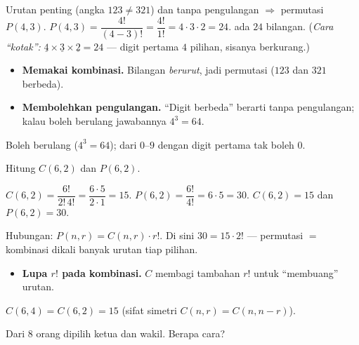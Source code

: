 \jawab
{} Urutan penting (angka $123\neq321$) dan tanpa pengulangan
$\Rightarrow$ permutasi $P(4,3)$.
 $P(4,3)=\dfrac{4!}{(4-3)!}=\dfrac{4!}{1!}=4\cdot3\cdot2=24$.
\jadi ada $24$ bilangan.
(\emph{Cara ``kotak'':} $\underline{4}\times\underline{3}\times\underline{2}=24$
--- digit pertama $4$ pilihan, sisanya berkurang.)

\begin{jebakan}
\begin{itemize}[leftmargin=*,topsep=2pt]
  \item \textbf{Memakai kombinasi.} Bilangan \emph{berurut}, jadi permutasi
  ($123$ dan $321$ berbeda).
  \item \textbf{Membolehkan pengulangan.} ``Digit berbeda'' berarti tanpa
  pengulangan; kalau boleh berulang jawabannya $4^3=64$.
\end{itemize}
\end{jebakan}

\begin{variasi}
Boleh berulang ($4^3=64$); dari $0$--$9$ dengan digit pertama tak boleh $0$.
\end{variasi}

\begin{soalbox}{}
Hitung $C(6,2)$ dan $P(6,2)$.
\end{soalbox}

\jawab
{} $C(6,2)=\dfrac{6!}{2!\,4!}=\dfrac{6\cdot5}{2\cdot1}=15$.
 $P(6,2)=\dfrac{6!}{4!}=6\cdot5=30$.
\jadi $C(6,2)=15$ dan $P(6,2)=30$.

\begin{tips}
Hubungan: $P(n,r)=C(n,r)\cdot r!$. Di sini $30=15\cdot2!$ --- permutasi $=$
kombinasi dikali banyak urutan tiap pilihan.
\end{tips}

\begin{jebakan}
\begin{itemize}[leftmargin=*,topsep=2pt]
  \item \textbf{Lupa $r!$ pada kombinasi.} $C$ membagi tambahan $r!$ untuk
  ``membuang'' urutan.
\end{itemize}
\end{jebakan}

\begin{variasi}
$C(6,4)=C(6,2)=15$ (sifat simetri $C(n,r)=C(n,n-r)$).
\end{variasi}

\begin{soalbox}{}
Dari $8$ orang dipilih ketua dan wakil. Berapa cara?
\end{soalbox}

